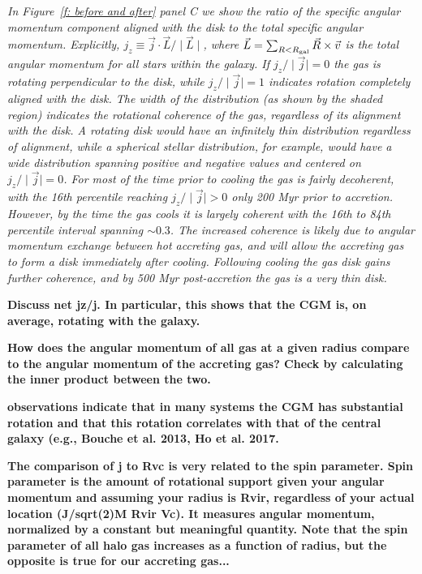 \documentclass[fleqn,usenatbib]{mnras}
\begin{document}
\textit{
In Figure~\ref{f: before and after} panel C we show the ratio of the specific angular momentum component aligned with the disk to the total specific angular momentum.
Explicitly, $j_z \equiv \vec j \cdot \vec L / \mid \vec L \mid $, where $\vec L = \sum_{R < R_{\rm gal}} \vec R \times \vec v$ is the total angular momentum for all stars within the galaxy.
If $j_z/\mid \vec j \mid=0$ the gas is rotating perpendicular to the disk, while $j_z/\mid \vec j \mid=1$  indicates rotation completely aligned with the disk.
The width of the distribution (as shown by the shaded region) indicates the rotational coherence of the gas, regardless of its alignment with the disk.
A rotating disk would have an infinitely thin distribution regardless of alignment, while a spherical stellar distribution, for example, would have a wide distribution spanning positive and negative values and centered on  $j_z/\mid \vec j \mid=0$.
For most of the time prior to cooling the gas is fairly decoherent, with the 16th percentile reaching  $j_z/\mid \vec j \mid > 0$  only 200 Myr prior to accretion.
However, by the time the gas cools it is largely coherent with the 16th to 84th percentile interval spanning $\sim 0.3$.
The increased coherence is likely due to angular momentum exchange between hot accreting gas, and will allow the accreting gas to form a disk immediately after cooling.
Following cooling the gas disk gains further coherence, and by 500 Myr post-accretion the gas is a very thin disk.
}

\textbf{
Discuss net jz/j.
In particular, this shows that the CGM is, on average, rotating with the galaxy.
}

\textbf{
How does the angular momentum of all gas at a given radius compare to the angular momentum of the accreting gas?
Check by calculating the inner product between the two.
}

\textbf{
observations indicate that in many systems the CGM has substantial rotation and that this rotation correlates with that of the central galaxy (e.g., Bouche et al. 2013, Ho et al. 2017.
}

\textbf{
The comparison of j to Rvc is very related to the spin parameter.
Spin parameter is the amount of rotational support given your angular momentum and assuming your radius is Rvir, regardless of your actual location (J/sqrt(2)M Rvir Vc).
It measures angular momentum, normalized by a constant but meaningful quantity.
Note that the spin parameter of all halo gas increases as a function of radius, but the opposite is true for our accreting gas...
}
\end{document}
